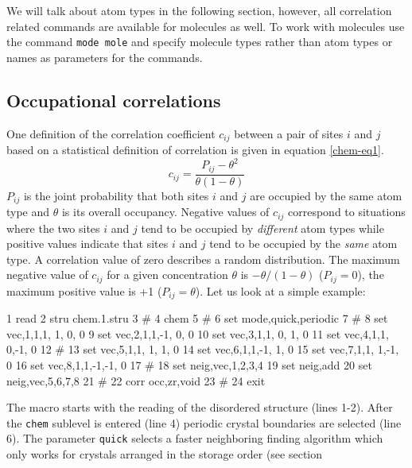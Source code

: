 We will talk about atom types in the following section, however, all
correlation related commands are available for molecules as well. To
work with molecules use the command {\tt mode mole} and specify
molecule types rather than atom types or names as parameters for the
commands.

\subsection*{Occupational correlations \label{chem-corr-occ}}

One definition of the correlation coefficient $c_{ij}$ between a
pair of sites $i$ and $j$ based on a statistical definition of
correlation \citep{we85} is given in equation \ref{chem-eq1}.
%
\begin{equation}
    c_{ij} = \frac {P_{ij} - \theta^{2}} { \theta (1 - \theta)}
    \label{chem-eq1}
\end{equation}
%
$P_{ij}$ is the joint probability that both sites $i$ and $j$ are
occupied by the same atom type and $\theta$ is its overall
occupancy.  Negative values of $c_{ij}$ correspond to situations
where the two sites $i$ and $j$ tend to be occupied by {\it
different} atom types while positive values indicate that sites $i$
and $j$ tend to be occupied by the {\it same} atom type.  A
correlation value of zero describes a random distribution.  The
maximum negative value of $c_{ij}$ for a given concentration
$\theta$ is $-\theta/(1-\theta)$ ($P_{ij}=0$), the maximum positive
value is +1 ($P_{ij}=\theta$). Let us look at a simple example:
%
\begin{MacVerbatim}
     1  read
     2  stru chem.1.stru
     3  #
     4  chem
     5  #
     6    set mode,quick,periodic
     7  #
     8    set vec,1,1,1, 1, 0, 0
     9    set vec,2,1,1,-1, 0, 0
    10    set vec,3,1,1, 0, 1, 0
    11    set vec,4,1,1, 0,-1, 0
    12  #
    13    set vec,5,1,1, 1, 1, 0
    14    set vec,6,1,1,-1, 1, 0
    15    set vec,7,1,1, 1,-1, 0
    16    set vec,8,1,1,-1,-1, 0
    17  #
    18    set neig,vec,1,2,3,4
    19    set neig,add
    20    set neig,vec,5,6,7,8
    21  #
    22    corr occ,zr,void
    23  #
    24  exit
\end{MacVerbatim}
%
The macro starts with the reading of the disordered structure (lines
1-2). After the {\tt chem} sublevel is entered (line 4) periodic
crystal boundaries are selected (line 6).  The parameter {\tt quick}
selects a faster neighboring finding algorithm which only works for
crystals arranged in the \Discus storage order (see section
